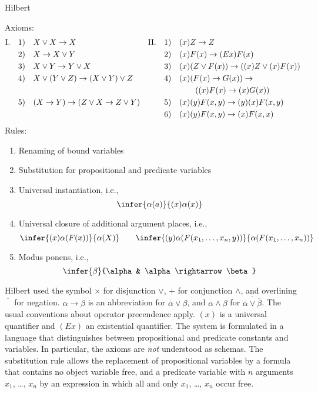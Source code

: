 \begin{entry}{Hilbert}  

\begin{calculus}
Axioms:
\begin{align*}
\text{I.\quad} 1)\quad & X \lor X \rightarrow X &
\text{II.}\quad 1)\quad & (x)Z \rightarrow Z\\
2) \quad & X \rightarrow X \lor Y &
2) \quad & (x)F(x) \rightarrow (Ex)F(x)\\
3) \quad & X \lor Y \rightarrow Y \lor X &
3) \quad & (x)(Z \lor F(x)) \rightarrow ((x)Z \lor (x)F(x))\\
4) \quad & X \lor (Y \lor Z) \rightarrow (X \lor Y) \lor Z &
4) \quad & (x)(F(x) \rightarrow G(x)) \rightarrow \\
&&& \qquad ((x)F(x) \rightarrow (x)G(x))\\
5) \quad & (X \rightarrow Y) \rightarrow (Z \lor X \rightarrow Z \lor Y) &
5) \quad & (x)(y)F(x, y) \rightarrow (y)(x)F(x, y)\\
&& 6) \quad & (x)(y)F(x, y) \rightarrow (x)F(x, x)
\end{align*}
Rules:
\begin{enumerate}
\item Renaming of bound variables
\item Substitution for propositional and predicate variables
\item Universal instantiation, i.e.,
\[
\infer{\alpha(a)}{(x)\alpha(x)}
\]
\item Universal closure of additional argument places, i.e.,
\[
\infer{(x)\alpha(F(x))}{\alpha(X)}
\qquad
\infer{(y)\alpha(F(x_1, \dots, x_n, y))}{\alpha(F(x_1, \dots, x_n))}
\]
\item Modus ponens, i.e.,
\[
\infer{\beta}{\alpha & \alpha \rightarrow \beta}
\]
\end{enumerate}

\end{calculus}

\begin{clarifications}
Hilbert used the symbol $\times$ for disjunction $\lor$, $+$ for
conjunction $\land$, and overlining $\overline{\phantom{X}}$ for
negation. $\alpha \rightarrow \beta$ is an abbreviation for
$\overline{\alpha} \lor \beta$, and $\alpha \land \beta$ for
$\overline{\overline{\alpha} \lor \overline{\beta}}$. The usual
conventions about operator precendence apply. $(x)$ is a universal
quantifier and $(Ex)$ an existential quantifier. The system is
formulated in a language that distinguishes between propositional and
predicate constants and variables. In particular, the axioms
are \emph{not} understood as schemas. The substitution rule allows the
replacement of propositional variables by a formula that contains no
object variable free, and a predicate variable with $n$ arguments
$x_1$, \dots, $x_n$ by an expression in which all and only $x_1$, \dots, $x_n$
occur free.
\end{clarifications}


\end{entry}
